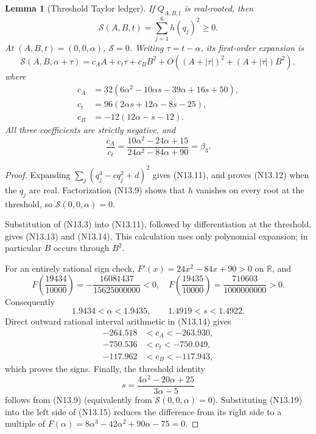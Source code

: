 \documentclass[11pt]{article}
\newtheorem{lemma}[theorem]{Lemma}
\theoremstyle{definition}
\theoremstyle{remark}
\begin{document}
\begin{lemma}[Threshold Taylor ledger]
\label{lem:f2v13-taylor}
If \(Q_{A,B,t}\) is real-rooted, then
\[
 \mathcal S(A,B,t)=\sum_{j=1}^6h(q_j)^2\geq0.
 \tag{N13.12}
\]
At \((A,B,t)=(0,0,\alpha)\), \(\mathcal S=0\).  Writing
\(\tau=t-\alpha\), its first-order expansion is
\[
 \mathcal S(A,B,\alpha+\tau)
 =c_AA+c_t\tau+c_BB^2
  +O\!\left((A+|\tau|)^2+(A+|\tau|)B^2\right),
 \tag{N13.13}
\]
where
\[
\begin{aligned}
 c_A&=32(6\alpha^2-10\alpha s-39\alpha+16s+50),\\
 c_t&=96(2\alpha s+12\alpha-8s-25),\\
 c_B&=-12(12\alpha-s-12).
\end{aligned}
\tag{N13.14}
\]
All three coefficients are strictly negative, and
\[
 \frac{c_A}{c_t}
 =\frac{10\alpha^2-24\alpha+15}
        {24\alpha^2-84\alpha+90}
 =\beta _3.
 \tag{N13.15}
\]
\end{lemma}

\begin{proof}
Expanding \(\sum_j(q_j^4-cq_j^2+d)^2\) gives
\textup{(N13.11)}, and proves \textup{(N13.12)} when the \(q_j\) are real.
Factorization \textup{(N13.9)} shows that \(h\) vanishes on every root at
the threshold, so \(\mathcal S(0,0,\alpha)=0\).

Substitution of \textup{(N13.3)} into \textup{(N13.11)}, followed by
differentiation at the threshold, gives \textup{(N13.13)} and
\textup{(N13.14)}.  This calculation uses only polynomial expansion; in
particular \(B\) occurs through \(B^2\).

For an entirely rational sign check, \(F'(x)=24x^2-84x+90>0\) on
\(\mathbb R\), and
\[
 F\!\left(\frac{19434}{10000}\right)
 =-\frac{16081437}{15625000000}<0,
 \quad
 F\!\left(\frac{19435}{10000}\right)
 =\frac{710603}{1000000000}>0.
 \tag{N13.16}
\]
Consequently
\[
 1.9434<\alpha<1.9435,
 \qquad 1.4919<s<1.4922.
 \tag{N13.17}
\]
Direct outward rational interval arithmetic in \textup{(N13.14)} gives
\[
\begin{aligned}
 -264.518&<c_A<-263.930,\\
 -750.536&<c_t<-750.049,\\
 -117.962&<c_B<-117.943,
\end{aligned}
\tag{N13.18}
\]
which proves the signs.  Finally, the threshold identity
\[
 s=\frac{4\alpha^2-20\alpha+25}{3\alpha-5}
 \tag{N13.19}
\]
follows from \textup{(N13.9)} (equivalently from
\(\mathcal S(0,0,\alpha)=0\)).  Substituting \textup{(N13.19)} into the
left side of \textup{(N13.15)} reduces the difference from its right side
to a multiple of
\(F(\alpha)=8\alpha^3-42\alpha^2+90\alpha-75=0\).
\end{proof}
\end{document}
